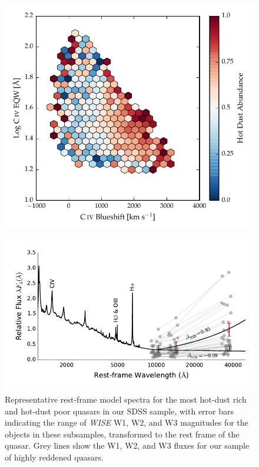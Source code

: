 \begin{figure}
\centering
  \includegraphics[width=\columnwidth]{figures/chapter06/hot_dust_beta.pdf}
\caption{}
  \label{fig:}
\end{figure}



\begin{figure}
\centering
  \includegraphics[width=\columnwidth]{figures/chapter06/ntt_proposal_figure2.pdf}
\caption{Representative rest-frame model spectra for the most hot-dust rich and hot-dust poor quasars in our SDSS sample, with error bars indicating the range of {\it WISE} W1, W2, and W3 magnitudes for the objects in these subsamples, transformed to the rest frame of the quasar. Grey lines show the W1, W2, and W3 fluxes for our sample of highly reddened quasars.}
  \label{fig:}
\end{figure}

